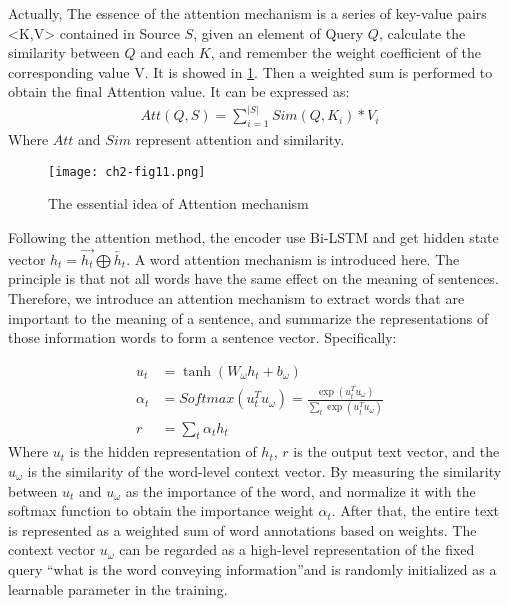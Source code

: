 Actually, The essence of the attention mechanism is a series of key-value pairs <K,V> contained in Source \(S\), given an element of Query \(Q\), calculate the similarity between \(Q\) and each \(K\), and remember the weight coefficient of the corresponding value V. It is showed in \figurename{\ref{ch2-fig10}}. Then a weighted sum is performed to obtain the final Attention value. It can be expressed as:
\begin{align}
	Att(Q,S) = \sum_{i=1}^{|S|}Sim(Q,K_i)*V_i
\end{align}
Where \(Att\) and \(Sim\) represent attention and similarity.

\begin{figure}[h]
	\centering
	\texttt{[image: ch2-fig11.png]}
	\caption{The essential idea of Attention mechanism}\label{ch2-fig10}
\end{figure}
Following the attention method, the encoder use Bi-LSTM and get hidden state vector \(h_t=\overrightarrow{h_t}\bigoplus \overleftarrow{h_t}\). A word attention mechanism is introduced here. The principle is that not all words have the same effect on the meaning of sentences. Therefore, we introduce an attention mechanism to extract words that are important to the meaning of a sentence, and summarize the representations of those information words to form a sentence vector.
Specifically:



\begin{align}
	u_t      & = \tanh(W_\omega h_t + b_\omega )                                                    \\
	\alpha_t & =Softmax(u_t^T u_\omega) = \frac{\exp( u_t^T u_\omega)}{\sum_t \exp(u_t^T u_\omega)} \\
	r        & = \sum_t{\alpha_t h_t}
\end{align}
Where \(u_t\) is the hidden representation of \(h_t\), \(r\) is the output text vector, and the \(u_\omega \) is the similarity of the word-level context vector. By measuring the similarity between \(u_t\) and \(u_\omega \) as the importance of the word, and normalize it with the softmax function to obtain the importance weight \(\alpha_{t}\). After that, the entire text is represented as a weighted sum of word annotations based on weights. The context vector \(u_\omega \) can be regarded as a high-level representation of the fixed query ``what is the word conveying information''and is randomly initialized as a learnable parameter in the training.

